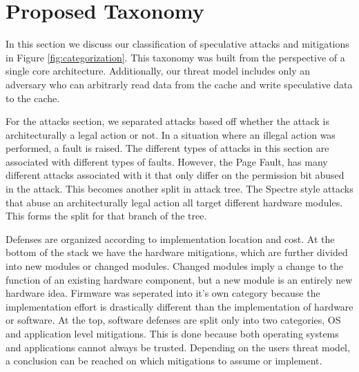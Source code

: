 \section{Proposed Taxonomy} \label{Proposed Taxonomy}

In this section we discuss our classification of speculative attacks and mitigations in Figure \ref{fig:categorization}.
This taxonomy was built from the perspective of a single core architecture.
Additionally, our threat model includes only an adversary who can arbitrarly read data from the cache and write speculative data to the cache.

For the attacks section, we separated attacks based off whether the attack is architecturally a legal action or not.
In a situation where an illegal action was performed, a fault is raised.
The different types of attacks in this section are associated with different types of faults.
However, the Page Fault, has many different attacks associated with it that only differ on the permission bit abused in the attack.
This becomes another split in attack tree.
The Spectre style attacks that abuse an architecturally legal action all target different hardware modules.
This forms the split for that branch of the tree.

Defenses are organized according to implementation location and cost.
At the bottom of the stack we have the hardware mitigations, which are further divided into new modules or changed modules.
Changed modules imply a change to the function of an existing hardware component, but a new module is an entirely new hardware idea.
Firmware was seperated into it's own category because the implementation effort is drastically different than the implementation of hardware or software.
At the top, software defenses are split only into two categories, OS and application level mitigations.
This is done because both operating systems and applications cannot always be trusted.
Depending on the users threat model, a conclusion can be reached on which mitigations to assume or implement.

